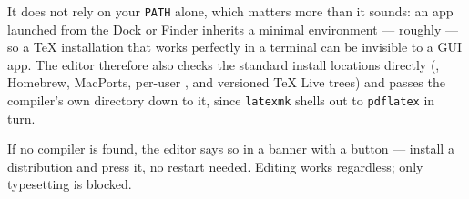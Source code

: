 It does not rely on your \texttt{PATH} alone, which matters more than it
sounds: an app launched from the Dock or Finder inherits a minimal environment
--- roughly  --- so a TeX installation that
works perfectly in a terminal can be invisible to a GUI app. The editor
therefore also checks the standard install locations directly
(, Homebrew, MacPorts, per-user ,
and versioned TeX Live trees) and passes the compiler's own directory down to
it, since \texttt{latexmk} shells out to \texttt{pdflatex} in turn.

If no compiler is found, the editor says so in a banner with a
 button --- install a distribution and press it, no restart
needed. Editing works regardless; only typesetting is blocked.
